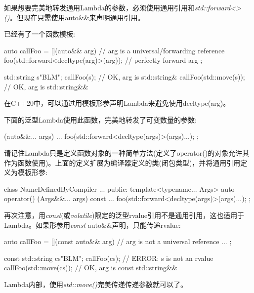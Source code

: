 如果想要完美地转发通用Lambda的参数，必须使用通用引用和\textit{std::forward<>()}。但现在只需使用auto\&\&来声明通用引用。

已经有了一个函数模板:

\begin{cppcode}
auto callFoo = [](auto&& arg) { // arg is a universal/forwarding reference
	foo(std::forward<decltype(arg)>(arg)); // perfectly forward arg
};

std::string s{"BLM"};
callFoo(s); // OK, arg is std::string&
callFoo(std::move(s)); // OK, arg is std::string&&
\end{cppcode}

在C++20中，可以通过用模板形参声明Lambda来避免使用decltype(arg)。

下面的泛型Lambda使用此函数，完美地转发了可变数量的参数:

\begin{cppcode}
[] (auto&&... args) {
	...
	foo(std::forward<decltype(args)>(args)...);
};
\end{cppcode}

请记住Lambda只是定义函数对象的一种简单方法(定义了operator()的对象允许其作为函数使用)。上面的定义扩展为编译器定义的类(闭包类型)，并将通用引用定义为模板形参:

\begin{cppcode}
class NameDefinedByCompiler {
	...
	public:
	template<typename... Args>
	auto operator() (Args&&... args) const {
		...
		foo(std::forward<decltype(args)>(args)...);
	}
};
\end{cppcode}

再次注意，用\textit{const}(或\textit{volatile})限定的泛型rvalue引用不是通用引用，这也适用于Lambda。如果形参用\textit{const} auto\&\&声明，只能传递rvalue:

\begin{cppcode}
auto callFoo = [](const auto&& arg) { // arg is not a universal reference
	...
};

const std::string cs{"BLM"};
callFoo(cs); // ERROR: s is not an rvalue
callFoo(std::move(cs)); // OK, arg is const std::string&&
\end{cppcode}

Lambda内部，使用\textit{std::move()}完美传递传递参数就可以了。
















































